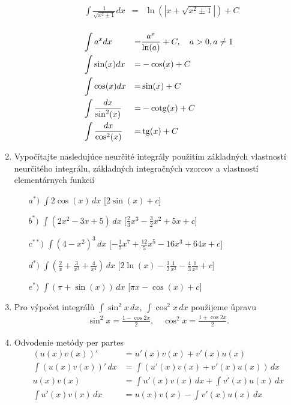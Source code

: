 \begin{enumerate}
\begin{minipage}[t]{0.40\linewidth}
\begin{align*}
&\int \frac{1}{\sqrt{x^2\pm1}} dx &=&\ln(|x+\sqrt{x^2 \pm 1}|) +C \\
\end{align*}
\end{minipage}
\begin{minipage}[t]{0.52\linewidth}
\begin{align*}
&\int a^x dx &=& \frac{a^x}{\ln(a)}+C, \quad a>0, a \neq 1 \\
&\int \sin(x) dx &=& -\cos(x)+C \\
&\int \cos(x) dx &=& \sin(x)+C \\
&\int \frac{dx}{\sin^2(x)} &=& -\operatorname{cotg}(x)+C \\
&\int \frac{dx}{\cos^2(x)} &=& \operatorname{tg}(x)+C 
\end{align*}
\end{minipage}

\item Vypočítajte nasledujúce neurčité integrály použitím základných vlastností neurčitého integrálu, základných integračných vzorcov a vlastností elementárnych funkcií
\begin{enumerate}
\item[$a^*)$]{$ \int 2 \cos (x) \,dx$} \hspace{\fill} [$2 \sin (x) +c$]
\item[$b^*)$]{$ \int (2x^2-3x+5)\,dx$} \hspace{\fill} [$ \frac{2}{3}x^3 -  \frac{3}{2}x^2 +5x +c$]
\item[$c^{**})$]{$ \int (4-x^2)^3\,dx$} \hspace{\fill} [$-\frac{1}{7}x^7+\frac{12}{5}  x^5- 16x^3  +64x+c$]
\item[$d^*)$]{$ \int (\frac{2}{x}+\frac{3}{x^3}+\frac{4}{x^4})\,dx$} \hspace{\fill} [$2 \ln(x) - \frac{3}{2} \frac{1}{x^2} -\frac{4}{3} \frac{1}{x^3} +c$]
\item[$e^*)$]{$ \int (\pi+\sin(x))\,dx$} \hspace{\fill} [$ \pi x - \cos(x) +c$]
\end{enumerate}

\item Pro výpočet integrálů $\int \sin^2x \,dx,\ \int \cos^2x \,dx $ použijeme úpravu
\begin{align*}
    \sin^2x=\frac{1-\cos2x}{2},\quad \cos^2x=\frac{1+\cos2x}{2}.
\end{align*}

\item Odvodenie metódy per partes
\begin{align*}
(u(x)v(x))'&=u'(x)v(x)+v'(x)u(x) \\
\int (u(x)v(x))'\, dx &= \int (u'(x)v(x)+v'(x)u(x)) \,dx\\
u(x)v(x)&= \int u'(x)v(x) \,dx + \int v'(x)u(x) \,dx \\
\int u'(x)v(x) \,dx&=u(x)v(x)- \int v'(x)u(x) \,dx 
\end{align*}


\end{enumerate}

